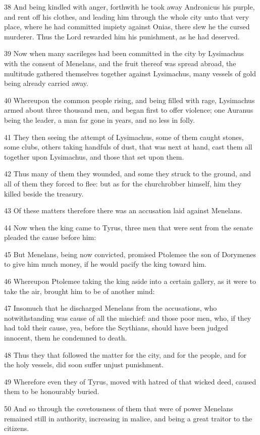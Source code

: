 \par 38 And being kindled with anger, forthwith he took away Andronicus his purple, and rent off his clothes, and leading him through the whole city unto that very place, where he had committed impiety against Onias, there slew he the cursed murderer. Thus the Lord rewarded him his punishment, as he had deserved.
\par 39 Now when many sacrileges had been committed in the city by Lysimachus with the consent of Menelans, and the fruit thereof was spread abroad, the multitude gathered themselves together against Lysimachus, many vessels of gold being already carried away.
\par 40 Whereupon the common people rising, and being filled with rage, Lysimachus armed about three thousand men, and began first to offer violence; one Auranus being the leader, a man far gone in years, and no less in folly.
\par 41 They then seeing the attempt of Lysimachus, some of them caught stones, some clubs, others taking handfuls of dust, that was next at hand, cast them all together upon Lysimachus, and those that set upon them.
\par 42 Thus many of them they wounded, and some they struck to the ground, and all of them they forced to flee: but as for the churchrobber himself, him they killed beside the treasury.
\par 43 Of these matters therefore there was an accusation laid against Menelans.
\par 44 Now when the king came to Tyrus, three men that were sent from the senate pleaded the cause before him:
\par 45 But Menelans, being now convicted, promised Ptolemee the son of Dorymenes to give him much money, if he would pacify the king toward him.
\par 46 Whereupon Ptolemee taking the king aside into a certain gallery, as it were to take the air, brought him to be of another mind:
\par 47 Insomuch that he discharged Menelans from the accusations, who notwithstanding was cause of all the mischief: and those poor men, who, if they had told their cause, yea, before the Scythians, should have been judged innocent, them he condemned to death.
\par 48 Thus they that followed the matter for the city, and for the people, and for the holy vessels, did soon suffer unjust punishment.
\par 49 Wherefore even they of Tyrus, moved with hatred of that wicked deed, caused them to be honourably buried.
\par 50 And so through the covetousness of them that were of power Menelans remained still in authority, increasing in malice, and being a great traitor to the citizens.

